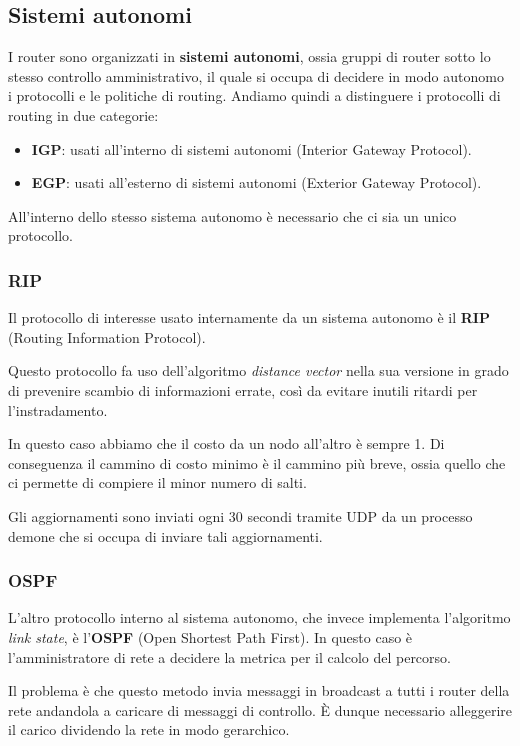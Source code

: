 \subsection{Sistemi autonomi}
I router sono organizzati in \textbf{sistemi autonomi}, ossia gruppi di
router sotto lo stesso controllo amministrativo, il quale si occupa di
decidere in modo autonomo i protocolli e le politiche di routing.
Andiamo quindi a distinguere i protocolli di routing in due categorie:
\begin{itemize}
	\item \textbf{IGP}: usati all'interno di sistemi autonomi 
		(Interior Gateway Protocol).
	\item \textbf{EGP}: usati all'esterno di sistemi autonomi 
		(Exterior Gateway Protocol).
\end{itemize}
All'interno dello stesso sistema autonomo è necessario che ci sia un 
unico protocollo.

\subsubsection{RIP}
Il protocollo di interesse usato internamente da un sistema autonomo
è il \textbf{RIP} (Routing Information Protocol).

Questo protocollo fa uso dell'algoritmo \emph{distance vector} nella 
sua versione in grado di prevenire scambio di informazioni errate, così
da evitare inutili ritardi per l'instradamento.

In questo caso abbiamo che il costo da un nodo all'altro è sempre 1.
Di conseguenza il cammino di costo minimo è il cammino più breve, ossia
quello che ci permette di compiere il minor numero di salti.

Gli aggiornamenti sono inviati ogni 30 secondi tramite UDP da un 
processo demone che si occupa di inviare tali aggiornamenti.

\subsubsection{OSPF}
L'altro protocollo interno al sistema autonomo, che invece implementa 
l'algoritmo \emph{link state}, è l'\textbf{OSPF} (Open Shortest Path
First). In questo caso è l'amministratore di rete a decidere la metrica
per il calcolo del percorso.

Il problema è che questo metodo invia messaggi in broadcast a tutti i
router della rete andandola a caricare di messaggi di controllo. \`E
dunque necessario alleggerire il carico dividendo la rete in modo
gerarchico.

